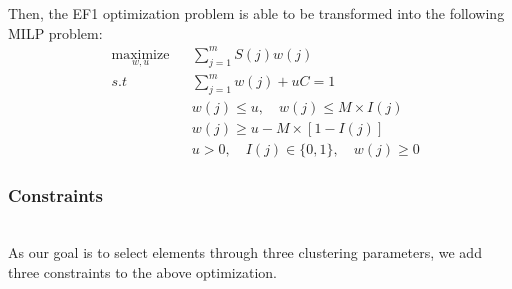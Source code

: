 Then, the EF1 optimization problem is able to be transformed into the following MILP problem:
\begin{equation}
\begin{aligned}
& \underset{w,u}{\text{maximize}}
& & \sum_{j=1}^m S(j)w(j) \\
& s.t
& & \sum_{j=1}^m w(j) + uC = 1 \\
& & & w(j) \leqslant u, \quad w(j) \leqslant M\times I(j)  \\
& & & w(j) \geqslant u - M\times [1-I(j)] \\
& & & u > 0,  \quad I(j) \in \{0, 1\}, \quad w(j) \geqslant 0 \label{eq:milp}
\end{aligned}
\end{equation}

\subsubsection{Constraints} \hfill \\
As our goal is to select elements through three clustering parameters, we add three constraints to the above optimization.
